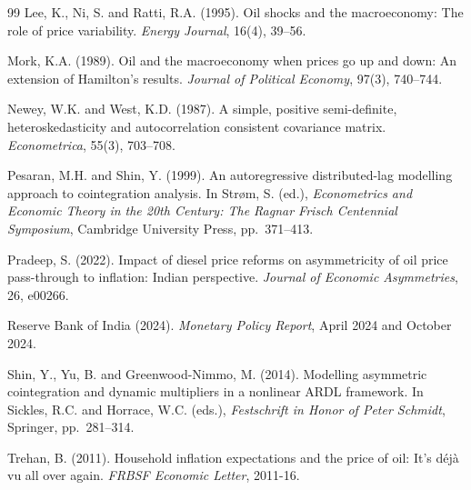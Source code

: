 \documentclass[12pt,a4paper,oneside]{report}
\begin{document}
\begin{thebibliography}{99}
Lee, K., Ni, S. and Ratti, R.A. (1995). Oil shocks and the macroeconomy: The role of price variability. \textit{Energy Journal}, 16(4), 39--56.

Mork, K.A. (1989). Oil and the macroeconomy when prices go up and down: An extension of Hamilton's results. \textit{Journal of Political Economy}, 97(3), 740--744.

Newey, W.K. and West, K.D. (1987). A simple, positive semi-definite, heteroskedasticity and autocorrelation consistent covariance matrix. \textit{Econometrica}, 55(3), 703--708.

Pesaran, M.H. and Shin, Y. (1999). An autoregressive distributed-lag modelling approach to cointegration analysis. In Str{\o}m, S. (ed.), \textit{Econometrics and Economic Theory in the 20th Century: The Ragnar Frisch Centennial Symposium}, Cambridge University Press, pp.\ 371--413.

Pradeep, S. (2022). Impact of diesel price reforms on asymmetricity of oil price pass-through to inflation: Indian perspective. \textit{Journal of Economic Asymmetries}, 26, e00266.

Reserve Bank of India (2024). \textit{Monetary Policy Report}, April 2024 and October 2024.

Shin, Y., Yu, B. and Greenwood-Nimmo, M. (2014). Modelling asymmetric cointegration and dynamic multipliers in a nonlinear ARDL framework. In Sickles, R.C. and Horrace, W.C. (eds.), \textit{Festschrift in Honor of Peter Schmidt}, Springer, pp.\ 281--314.

Trehan, B. (2011). Household inflation expectations and the price of oil: It's d\'ej\`a vu all over again. \textit{FRBSF Economic Letter}, 2011-16.

\end{thebibliography}

\appendix

\end{document}
